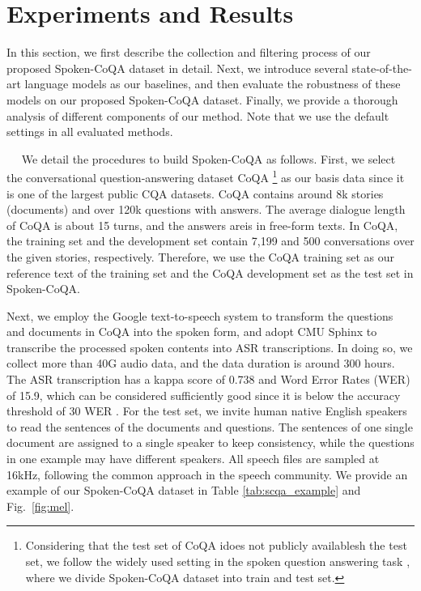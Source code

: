 \documentclass[11pt]{article}
\newcommand{\myparagraph}[1]{\vspace{2pt}\noindent{\bf{#1}}~~}
\begin{document}
\section{Experiments and Results}
\vspace{-0.5em}
In this section, we first describe the collection and filtering process of our proposed Spoken-CoQA dataset in detail. Next, we introduce several state-of-the-art language models as our baselines, and then evaluate the robustness of these models on our proposed Spoken-CoQA dataset. Finally, we provide a thorough analysis of different components of our method. Note that we use the default settings in all evaluated methods.



\myparagraph{Data Collection.}
\label{subsec:data}
We detail the procedures to build Spoken-CoQA as follows.  First, we select the conversational question-answering dataset CoQA \cite{reddy2019coqa}\footnote{Considering that the test set of CoQA \cite{reddy2019coqa} idoes not publicly availablesh the test set, we follow the widely used setting in the spoken question answering task \cite{li2018spoken}, where we divide Spoken-CoQA dataset into train and test set.} as our basis data since it is one of the largest public CQA datasets. CoQA contains around 8k stories (documents) and over 120k questions with answers. The average dialogue length of CoQA is about 15 turns, and the answers areis in free-form texts. In CoQA, the training set and the development set contain 7,199 and 500 conversations over the given stories, respectively. Therefore, we use the CoQA training set as our reference text of the training set and the CoQA development set as the test set in Spoken-CoQA.

Next, we employ the Google text-to-speech system to transform the questions and documents in CoQA into the spoken form, and adopt CMU Sphinx to transcribe the processed spoken contents into ASR transcriptions. In doing so, we collect more than 40G audio data, and the data duration is around 300 hours. The ASR transcription has a kappa score of 0.738 and Word Error Rates (WER) of 15.9, which can be considered sufficiently good since it is below the accuracy threshold of 30 WER \cite{gaur2016effects}. For the test set, we invite  human native English speakers to read the sentences of the documents and questions. The sentences of one single document are assigned to a single speaker to keep consistency, while the questions in one example may have different speakers. All speech files are sampled at 16kHz, following the common approach in the speech community. We provide an example of our Spoken-CoQA dataset in Table \ref{tab:scqa_example} and Fig.~\ref{fig:mel}.
\end{document}
